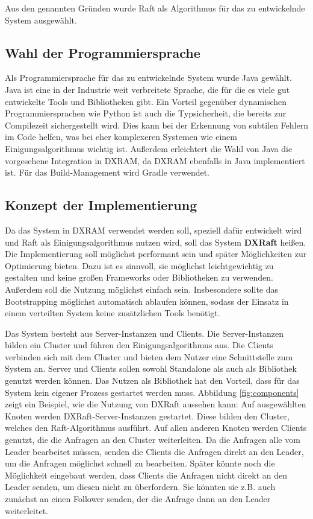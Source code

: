 Aus den genannten Gründen wurde Raft als Algorithmus für das zu entwickelnde System ausgewählt.

\subsection{Wahl der Programmiersprache}
 \label{sprache}

Als Programmiersprache für das zu entwickelnde System wurde Java gewählt. Java ist eine in der Industrie weit verbreitete Sprache, die für die es viele gut entwickelte Tools und Bibliotheken gibt. Ein Vorteil gegenüber dynamischen Programmiersprachen wie Python ist auch die Typsicherheit, die bereits zur Compilezeit sichergestellt wird. Dies kann bei der Erkennung von subtilen Fehlern im Code helfen, was bei eher komplexeren Systemen wie einem Einigungsalgorithmus wichtig ist. Außerdem erleichtert die Wahl von Java die vorgesehene Integration in DXRAM, da DXRAM ebenfalls in Java implementiert ist. Für das Build-Management wird Gradle verwendet.

\subsection{Konzept der Implementierung}
 \label{konzept}

Da das System in DXRAM verwendet werden soll, speziell dafür entwickelt wird und Raft als Einigungsalgorithmus nutzen wird, soll das System \textbf{DXRaft} heißen. Die Implementierung soll möglichst performant sein und später Möglichkeiten zur Optimierung bieten. Dazu ist es sinnvoll, sie möglichst leichtgewichtig zu gestalten und keine großen Frameworks oder Bibliotheken zu verwenden. Außerdem soll die Nutzung möglichst einfach sein. Insbesondere sollte das Bootstrapping möglichst automatisch ablaufen können, sodass der Einsatz in einem verteilten System keine zusätzlichen Tools benötigt.

Das System besteht aus Server-Instanzen und Clients. Die Server-Instanzen bilden ein Cluster und führen den Einigungsalgorithmus aus. Die Clients verbinden sich mit dem Cluster und bieten dem Nutzer eine Schnittstelle zum System an. Server und Clients sollen sowohl Standalone als auch als Bibliothek genutzt werden können. Das Nutzen als Bibliothek hat den Vorteil, dass für das System kein eigener Prozess gestartet werden muss. Abbildung \ref{fig:components} zeigt ein Beispiel, wie die Nutzung von DXRaft aussehen kann: Auf ausgewählten Knoten werden DXRaft-Server-Instanzen gestartet. Diese bilden den Cluster, welches den Raft-Algorithmus ausführt. Auf allen anderen Knoten werden Clients genutzt, die die Anfragen an den Cluster weiterleiten. Da die Anfragen alle vom Leader bearbeitet müssen, senden die Clients die Anfragen direkt an den Leader, um die Anfragen möglichst schnell zu bearbeiten. Später könnte noch die Möglichkeit eingebaut werden, dass Clients die Anfragen nicht direkt an den Leader senden, um diesen nicht zu überfordern. Sie könnten sie z.B. auch zunächst an einen Follower senden, der die Anfrage dann an den Leader weiterleitet.

